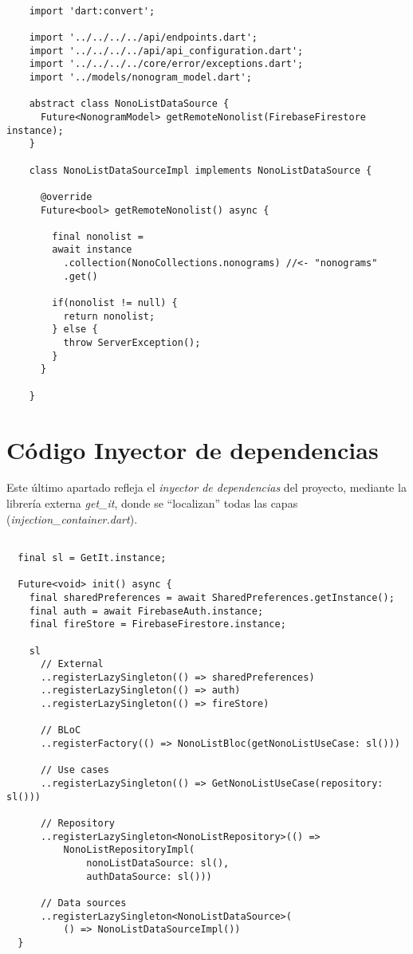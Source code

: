     \begin{lstlisting}

    import 'dart:convert';
    
    import '../../../../api/endpoints.dart';
    import '../../../../api/api_configuration.dart';
    import '../../../../core/error/exceptions.dart';
    import '../models/nonogram_model.dart';
    
    abstract class NonoListDataSource {
      Future<NonogramModel> getRemoteNonolist(FirebaseFirestore instance);
    }

    class NonoListDataSourceImpl implements NonoListDataSource {

      @override
      Future<bool> getRemoteNonolist() async {
        
        final nonolist = 
        await instance
          .collection(NonoCollections.nonograms) //<- "nonograms"
          .get()
        
        if(nonolist != null) {
          return nonolist;
        } else {
          throw ServerException();
        }
      }

    }
  \end{lstlisting}

  \section{Código Inyector de dependencias}

  \label{cap:anexo1-5}
    
  Este último apartado refleja el \textit{inyector de dependencias} del proyecto,
  mediante la librería externa \textit{get\_it}, donde se ``localizan'' todas
  las capas  (\textit{injection\_container.dart}).

\begin{lstlisting}

  final sl = GetIt.instance;

  Future<void> init() async {
    final sharedPreferences = await SharedPreferences.getInstance();
    final auth = await FirebaseAuth.instance;
    final fireStore = FirebaseFirestore.instance;
  
    sl
      // External
      ..registerLazySingleton(() => sharedPreferences)
      ..registerLazySingleton(() => auth)
      ..registerLazySingleton(() => fireStore)
  
      // BLoC
      ..registerFactory(() => NonoListBloc(getNonoListUseCase: sl()))
  
      // Use cases
      ..registerLazySingleton(() => GetNonoListUseCase(repository: sl()))

      // Repository
      ..registerLazySingleton<NonoListRepository>(() =>
          NonoListRepositoryImpl(
              nonoListDataSource: sl(),
              authDataSource: sl()))
      
      // Data sources
      ..registerLazySingleton<NonoListDataSource>(
          () => NonoListDataSourceImpl())
  }
  
\end{lstlisting}
